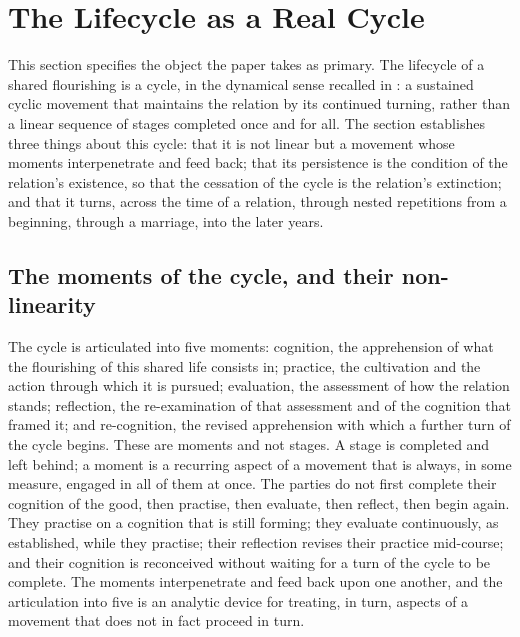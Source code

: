 \section{The Lifecycle as a Real Cycle}
\label{p11:sec:cycle}

\noindent
This section specifies the object the paper takes as primary. The lifecycle of a shared flourishing is a cycle, in the dynamical sense recalled in : a sustained cyclic movement that maintains the relation by its continued turning, rather than a linear sequence of stages completed once and for all. The section establishes three things about this cycle: that it is not linear but a movement whose moments interpenetrate and feed back; that its persistence is the condition of the relation's existence, so that the cessation of the cycle is the relation's extinction; and that it turns, across the time of a relation, through nested repetitions from a beginning, through a marriage, into the later years.

\subsection{The moments of the cycle, and their non-linearity}
\label{p11:sec:cyc-moments}

The cycle is articulated into five moments: cognition, the apprehension of what the flourishing of this shared life consists in; practice, the cultivation and the action through which it is pursued; evaluation, the assessment of how the relation stands; reflection, the re-examination of that assessment and of the cognition that framed it; and re-cognition, the revised apprehension with which a further turn of the cycle begins. These are moments and not stages. A stage is completed and left behind; a moment is a recurring aspect of a movement that is always, in some measure, engaged in all of them at once. The parties do not first complete their cognition of the good, then practise, then evaluate, then reflect, then begin again. They practise on a cognition that is still forming; they evaluate continuously, as  established, while they practise; their reflection revises their practice mid-course; and their cognition is reconceived without waiting for a turn of the cycle to be complete. The moments interpenetrate and feed back upon one another, and the articulation into five is an analytic device for treating, in turn, aspects of a movement that does not in fact proceed in turn.


